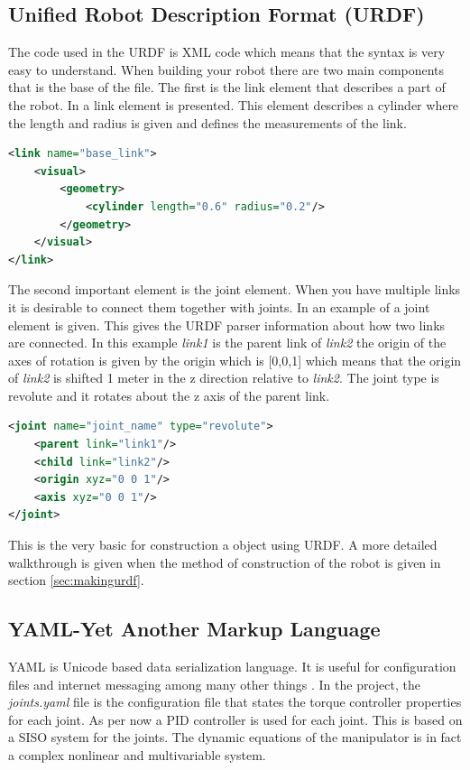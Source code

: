 \subsection{Unified Robot Description Format (URDF)}\label{sec:basicURDF}
The code used in the URDF is XML code which means that the syntax is very easy to understand\cite{XMLdoc}. When building your robot there are two main components that is the base of the file. The first is the link element that describes a part of the robot. In  a link element is presented. This element describes a cylinder where the length and radius is given and defines the measurements of the link. 


\begin{lstlisting}[language=xml,caption={URDF code example of a link element},label={lst:example}]
<link name="base_link">
    <visual>
        <geometry>
            <cylinder length="0.6" radius="0.2"/>
        </geometry>
    </visual>
</link>
\end{lstlisting}
The second important element is the joint element. When you have multiple links it is desirable to connect them together with joints. In  an example of a joint element is given. This gives the URDF parser information about how two links are connected. In this example \textit{link1} is the parent link of \textit{link2} the origin of the axes of rotation is given by the origin which is [0,0,1] which means that the origin of \textit{link2} is shifted 1 meter in the z direction relative to \textit{link2}. The joint type is revolute and it rotates about the z axis of the parent link. 

\begin{lstlisting}[language=xml,caption={URDF code example of a joint element},label={lst:jointexample}]
<joint name="joint_name" type="revolute">
    <parent link="link1"/>
    <child link="link2"/>
    <origin xyz="0 0 1"/>
    <axis xyz="0 0 1"/>
</joint>
\end{lstlisting}
This is the very basic for construction a object using URDF. A more detailed walkthrough is given when the method of construction of the robot is given in section \ref{sec:makingurdf}\cite{ROSWiki}.


\subsection{YAML-Yet Another Markup Language}
YAML is Unicode based data serialization language. It is useful for configuration files and internet messaging among many other things \cite{YAMLdoc}. In the project, the \textit{joints.yaml} file is the configuration file that states the torque controller properties for each joint. As per now a PID controller is used for each joint. This is based on a SISO system for the joints. The dynamic equations of the manipulator is in fact a complex nonlinear and multivariable system\cite{spong}.

